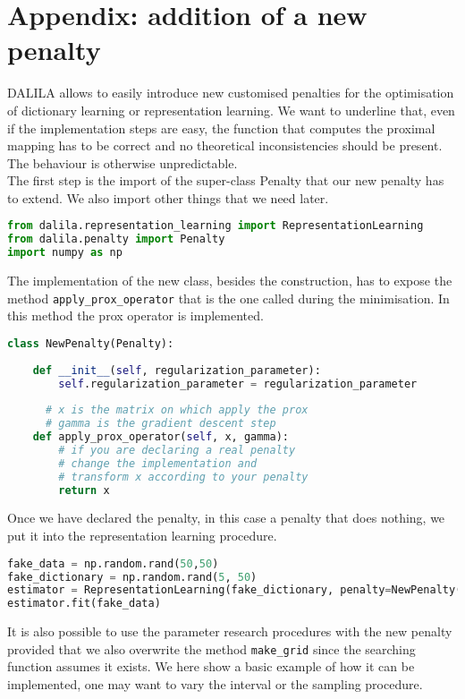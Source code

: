 \section{Appendix: addition of a new penalty} \label{new penalty}
DALILA allows to easily introduce new customised penalties for the optimisation of dictionary learning or representation learning. We want to underline that, even if the implementation steps are easy, the function that computes the proximal mapping has to be correct and no theoretical inconsistencies should be present. The behaviour is otherwise unpredictable.  \\


The first step is the import of the super-class Penalty that our new penalty has to extend. We also import other things that we need later.
\begin{lstlisting}[language=Python]
from dalila.representation_learning import RepresentationLearning
from dalila.penalty import Penalty
import numpy as np
\end{lstlisting}
The implementation of the new class, besides the construction, has to expose the method \texttt{apply\_prox\_operator} that is the one called during the minimisation. In this method the prox operator is implemented. 
\begin{lstlisting}[language=Python]
class NewPenalty(Penalty):
    
    def __init__(self, regularization_parameter):
        self.regularization_parameter = regularization_parameter
	
	  # x is the matrix on which apply the prox
	  # gamma is the gradient descent step
    def apply_prox_operator(self, x, gamma): 
        # if you are declaring a real penalty
        # change the implementation and 
        # transform x according to your penalty
        return x

\end{lstlisting}
Once we have declared the penalty, in this case a penalty that does nothing, we put it into the representation learning procedure. 
\begin{lstlisting}[language=Python]
fake_data = np.random.rand(50,50)
fake_dictionary = np.random.rand(5, 50)
estimator = RepresentationLearning(fake_dictionary, penalty=NewPenalty(5))
estimator.fit(fake_data)
\end{lstlisting}\vspace{0.2cm}
It is also possible to use the parameter research procedures with the new penalty provided that we also overwrite the method \texttt{make\_grid} since the searching function assumes it exists. We here show a basic example of how it can be implemented, one may want to vary the interval or the sampling procedure. 
